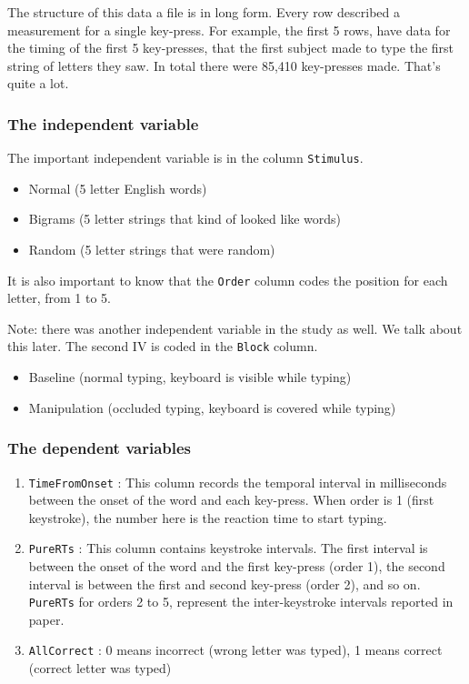 \documentclass[]{book}
\providecommand{\tightlist}{%
  \setlength{\itemsep}{0pt}\setlength{\parskip}{0pt}}
\begin{document}
The structure of this data a file is in long form. Every row described a
measurement for a single key-press. For example, the first 5 rows, have
data for the timing of the first 5 key-presses, that the first subject
made to type the first string of letters they saw. In total there were
85,410 key-presses made. That's quite a lot.

\subsubsection{The independent
variable}\label{the-independent-variable-1}

The important independent variable is in the column \texttt{Stimulus}.

\begin{itemize}
\tightlist
\item
  Normal (5 letter English words)
\item
  Bigrams (5 letter strings that kind of looked like words)
\item
  Random (5 letter strings that were random)
\end{itemize}

It is also important to know that the \texttt{Order} column codes the
position for each letter, from 1 to 5.

Note: there was another independent variable in the study as well. We
talk about this later. The second IV is coded in the \texttt{Block}
column.

\begin{itemize}
\tightlist
\item
  Baseline (normal typing, keyboard is visible while typing)
\item
  Manipulation (occluded typing, keyboard is covered while typing)
\end{itemize}

\subsubsection{The dependent variables}\label{the-dependent-variables}

\begin{enumerate}
\def\labelenumi{\arabic{enumi}.}
\tightlist
\item
  \texttt{TimeFromOnset} : This column records the temporal interval in
  milliseconds between the onset of the word and each key-press. When
  order is 1 (first keystroke), the number here is the reaction time to
  start typing.
\item
  \texttt{PureRTs} : This column contains keystroke intervals. The first
  interval is between the onset of the word and the first key-press
  (order 1), the second interval is between the first and second
  key-press (order 2), and so on. \texttt{PureRTs} for orders 2 to 5,
  represent the inter-keystroke intervals reported in paper.
\item
  \texttt{AllCorrect} : 0 means incorrect (wrong letter was typed), 1
  means correct (correct letter was typed)
\end{enumerate}
\end{document}

